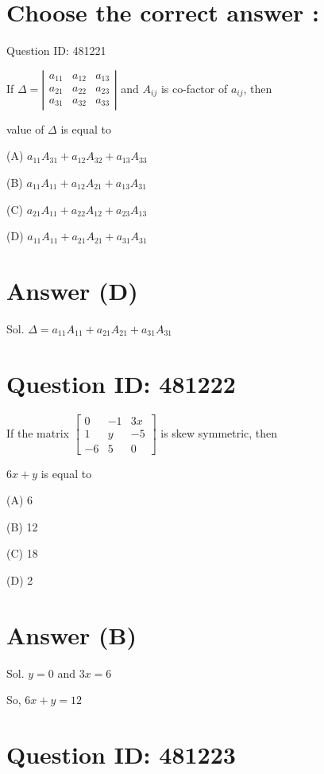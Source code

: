 
\section*{Choose the correct answer :}

Question ID: 481221

If $\Delta=\left|\begin{array}{lll}a_{11} & a_{12} & a_{13} \\ a_{21} & a_{22} & a_{23} \\ a_{31} & a_{32} & a_{33}\end{array}\right|$ and $A_{i j}$ is co-factor of $a_{i j}$, then

value of $\Delta$ is equal to

(A) $a_{11} A_{31}+a_{12} A_{32}+a_{13} A_{33}$

(B) $a_{11} A_{11}+a_{12} A_{21}+a_{13} A_{31}$

(C) $a_{21} A_{11}+a_{22} A_{12}+a_{23} A_{13}$

(D) $a_{11} A_{11}+a_{21} A_{21}+a_{31} A_{31}$

\section*{Answer (D)}

Sol. $\Delta=a_{11} A_{11}+a_{21} A_{21}+a_{31} A_{31}$

\section*{Question ID: 481222}

If the matrix $\left[\begin{array}{ccc}0 & -1 & 3 x \\ 1 & y & -5 \\ -6 & 5 & 0\end{array}\right]$ is skew symmetric, then

$6 x+y$ is equal to

(A) 6

(B) 12

(C) 18

(D) 2

\section*{Answer (B)}

Sol. $y=0$ and $3 x=6$

So, $6 x+y=12$

\section*{Question ID: 481223}

